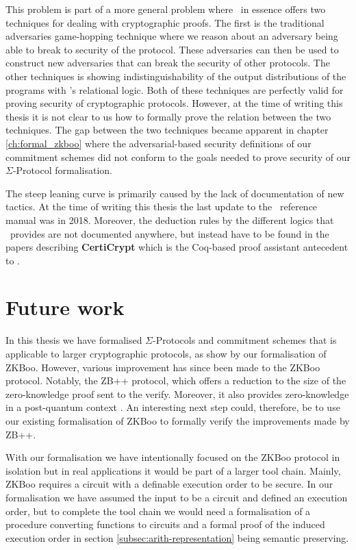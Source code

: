 This problem is part of a more general problem where \easycrypt\ in essence
offers two techniques for dealing with cryptographic proofs. The first is the
traditional adversaries game-hopping technique where we reason about an
adversary being able to break to security of the protocol. These adversaries can
then be used to construct new adversaries that can break the security of other protocols.
The other techniques is showing indistinguishability of the output distributions
of the programs with \easycrypt's relational logic.
Both of these techniques are perfectly valid for proving security of
cryptographic protocols. However, at the time of writing this thesis it is not
clear to us how to formally prove the relation between the two techniques.
The gap between the two techniques became apparent in chapter \ref{ch:formal_zkboo} where the
adversarial-based security definitions of our commitment schemes did not conform
to the goals needed to prove security of our $\Sigma$-Protocol formalisation.

The steep leaning curve is primarily caused by the lack of documentation of new
tactics. At the time of writing this thesis the last update to the \easycrypt\
reference manual \cite{ec_refman} was in 2018. Moreover, the deduction rules by
the different logics that \easycrypt\ provides are not documented anywhere, but
instead have to be found in the papers describing \textbf{CertiCrypt} which is
the Coq-based proof assistant antecedent to \easycrypt.

\section{Future work}
\label{sec:future_work}
In this thesis we have formalised $\Sigma$-Protocols and
commitment schemes that is applicable to larger cryptographic protocols, as show
by our formalisation of ZKBoo. However, various improvement has since been made to the
ZKBoo protocol. Notably, the ZB++ protocol, which offers a reduction to the
size of the zero-knowledge proof sent to the verify. Moreover, it also provides zero-knowledge
in a post-quantum context \cite{zkb++}. An interesting next step could,
therefore, be to use our existing formalisation of ZKBoo to formally verify the
improvements made by ZB++.

With our formalisation we have intentionally focused on the ZKBoo protocol in
isolation but in real applications it would be part of a larger tool chain.
Mainly, ZKBoo requires a circuit with a definable execution order to be secure.
In our formalisation we have assumed the input to be a circuit and defined an
execution order, but to complete the tool chain we would need a formalisation of
a procedure converting functions to circuits and a formal proof of the induced
execution order in section \ref{subsec:arith-representation} being semantic preserving.

